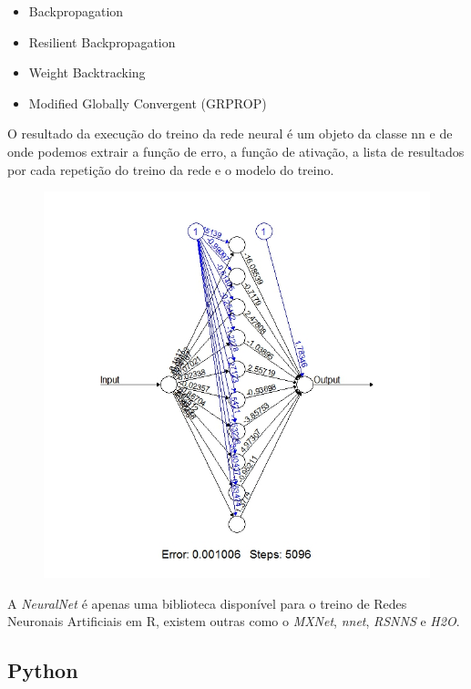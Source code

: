 \begin{itemize}
    \item Backpropagation
    \item Resilient Backpropagation
    \item Weight Backtracking 
    \item Modified Globally Convergent (GRPROP)
\end{itemize}

O resultado da execução do treino da rede neural é um objeto da classe nn e de onde podemos extrair a função de erro, a função de ativação, a lista de resultados por cada repetição do treino da rede e o modelo do treino.

\begin{figure}[H]
    \includegraphics[scale=0.6]{tex/img/SquareRootNeuralNetImage.jpeg}
\end{figure}

\vspace{2mm} A \textit{NeuralNet} é apenas uma biblioteca disponível para o treino de Redes Neuronais Artificiais em R, existem outras como o \textit{MXNet}, \textit{nnet}, \textit{RSNNS} e \textit{H2O}.

\newpage

\subsection*{Python}

